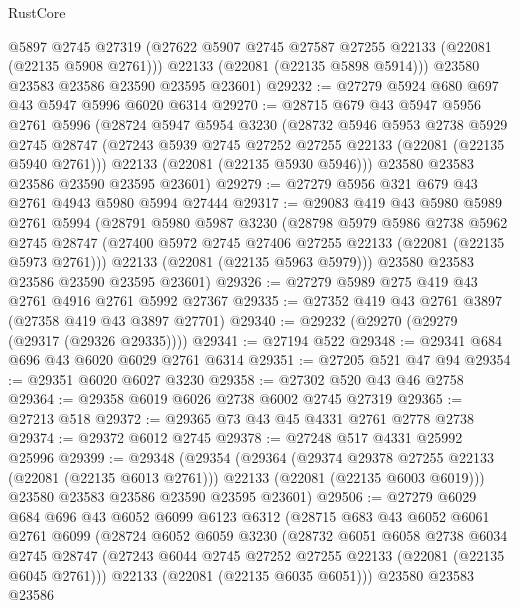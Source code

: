 \begin{lexlean}{RustCore}
\begin{coremodule}
        @5897
        @2745
        @27319
        (@27622 @5907 @2745 @27587 @27255 @22133 (@22081 (@22135 @5908 @2761)))
        @22133
        (@22081 (@22135 @5898 @5914)))
      @23580
      @23583
      @23586
      @23590
      @23595
      @23601)
@29232 := @27279 @5924 @680 @697 @43 @5947 @5996 @6020 @6314
@29270 := @28715
    @679
    @43
    @5947
    @5956
    @2761
    @5996
    (@28724
      @5947
      @5954
      @3230
      (@28732
        @5946
        @5953
        @2738
        @5929
        @2745
        @28747
        (@27243 @5939 @2745 @27252 @27255 @22133 (@22081 (@22135 @5940 @2761)))
        @22133
        (@22081 (@22135 @5930 @5946)))
      @23580
      @23583
      @23586
      @23590
      @23595
      @23601)
@29279 := @27279 @5956 @321 @679 @43 @2761 @4943 @5980 @5994 @27444
@29317 := @29083
    @419
    @43
    @5980
    @5989
    @2761
    @5994
    (@28791
      @5980
      @5987
      @3230
      (@28798
        @5979
        @5986
        @2738
        @5962
        @2745
        @28747
        (@27400 @5972 @2745 @27406 @27255 @22133 (@22081 (@22135 @5973 @2761)))
        @22133
        (@22081 (@22135 @5963 @5979)))
      @23580
      @23583
      @23586
      @23590
      @23595
      @23601)
@29326 := @27279 @5989 @275 @419 @43 @2761 @4916 @2761 @5992 @27367
@29335 := @27352 @419 @43 @2761 @3897 (@27358 @419 @43 @3897 @27701)
@29340 := @29232 (@29270 (@29279 (@29317 (@29326 @29335))))
@29341 := @27194 @522
@29348 := @29341 @684 @696 @43 @6020 @6029 @2761 @6314
@29351 := @27205 @521 @47 @94
@29354 := @29351 @6020 @6027 @3230
@29358 := @27302 @520 @43 @46 @2758
@29364 := @29358 @6019 @6026 @2738 @6002 @2745 @27319
@29365 := @27213 @518
@29372 := @29365 @73 @43 @45 @4331 @2761 @2778 @2738
@29374 := @29372 @6012 @2745
@29378 := @27248 @517 @4331 @25992 @25996
@29399 := @29348
    (@29354
      (@29364
        (@29374 @29378 @27255 @22133 (@22081 (@22135 @6013 @2761)))
        @22133
        (@22081 (@22135 @6003 @6019)))
      @23580
      @23583
      @23586
      @23590
      @23595
      @23601)
@29506 := @27279
    @6029
    @684
    @696
    @43
    @6052
    @6099
    @6123
    @6312
    (@28715
      @683
      @43
      @6052
      @6061
      @2761
      @6099
      (@28724
        @6052
        @6059
        @3230
        (@28732
          @6051
          @6058
          @2738
          @6034
          @2745
          @28747
          (@27243 @6044 @2745 @27252 @27255 @22133 (@22081 (@22135 @6045 @2761)))
          @22133
          (@22081 (@22135 @6035 @6051)))
        @23580
        @23583
        @23586

\end{coremodule}
\end{lexlean}
